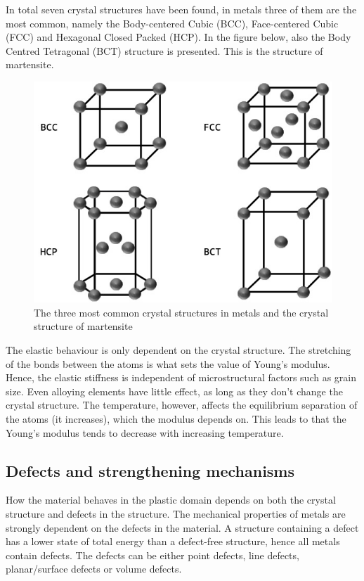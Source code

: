 \documentclass{article}
\begin{document}
In total seven crystal structures have been found, in metals three of them are the most common, namely the Body-centered Cubic (BCC), Face-centered Cubic (FCC) and Hexagonal Closed Packed (HCP). In the figure below, also the Body Centred Tetragonal (BCT) structure is presented. This is the structure of martensite.
\begin{figure}[h!]
    \includegraphics[width=\linewidth]{Crystalstructures.jpg}
    \caption{The three most common crystal structures in metals and the crystal structure of martensite}
    \label{fig:Crystal structures}

\end{figure}

The elastic behaviour is only dependent on the crystal structure. The stretching of the bonds between the atoms is what sets the value of Young's modulus. Hence, the elastic stiffness is independent of microstructural factors such as grain size. Even alloying elements have little effect, as long as they don't change the crystal structure. The temperature, however, affects the equilibrium separation of the atoms (it increases), which the modulus depends on. This leads to that the Young's modulus tends to decrease with increasing temperature.

\subsection{Defects and strengthening mechanisms}
How the material behaves in the plastic domain depends on both the crystal structure and defects in the structure. The mechanical properties of metals are strongly dependent on the defects in the material. A structure containing a defect has a lower state of total energy than a defect-free structure, hence all metals contain defects. The defects can be either point defects, line defects, planar/surface defects or volume defects.  
\end{document}
